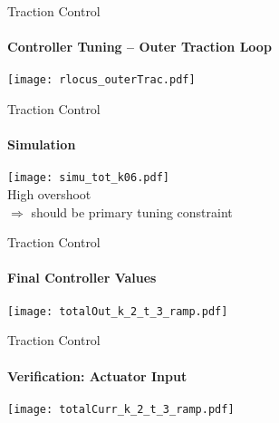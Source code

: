 \begin{frame}{Traction Control}
\framesubtitle{Controller Tuning -- Outer Traction Loop}
\texttt{[image: rlocus\_outerTrac.pdf]}
\end{frame}

\begin{frame}{Traction Control}
\framesubtitle{Simulation}
\texttt{[image: simu\_tot\_k06.pdf]}\\
High overshoot\\$\Rightarrow$ should be primary tuning constraint
\end{frame}

\begin{frame}{Traction Control}
\framesubtitle{Final Controller Values}
\texttt{[image: totalOut\_k\_2\_t\_3\_ramp.pdf]}
\end{frame}

\begin{frame}{Traction Control}
\framesubtitle{Verification: Actuator Input}
\centering
\texttt{[image: totalCurr\_k\_2\_t\_3\_ramp.pdf]}
\end{frame}





